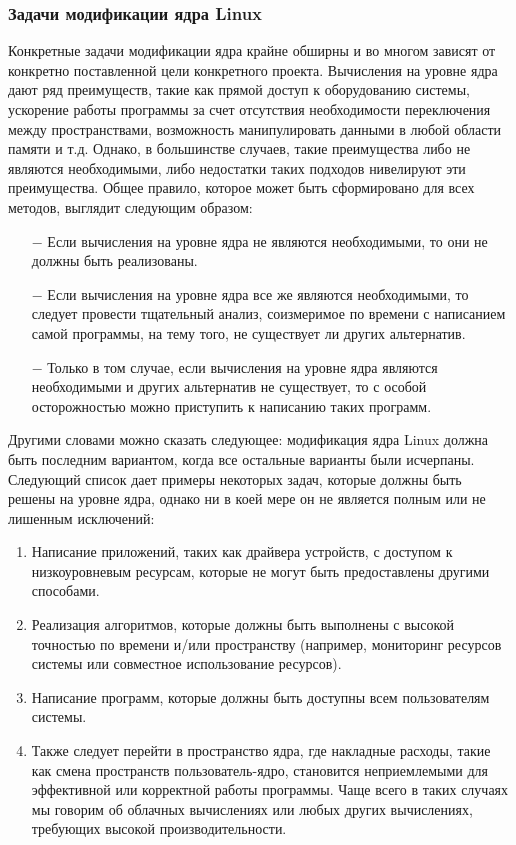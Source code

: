 \subsubsection{Задачи модификации ядра Linux}\label{subsec:---linux}
Конкретные задачи модификации ядра крайне обширны и во многом зависят от конкретно поставленной цели конкретного проекта.
Вычисления на уровне ядра дают ряд преимуществ, такие как прямой доступ к оборудованию системы,
ускорение работы программы за счет отсутствия необходимости переключения между пространствами,
возможность манипулировать данными в любой области памяти и т.д.
Однако, в большинстве случаев, такие преимущества либо не являются необходимыми, либо недостатки таких подходов нивелируют эти преимущества.
Общее правило, которое может быть сформировано для всех методов, выглядит следующим образом:
\begin{itemize}
    \item[$-$] Если вычисления на уровне ядра не являются необходимыми, то они не должны быть реализованы.
    \item[$-$] Если вычисления на уровне ядра все же являются необходимыми, то следует провести тщательный анализ, соизмеримое по времени с написанием самой программы, на тему того, не существует ли других альтернатив.
    \item[$-$] Только в том случае, если вычисления на уровне ядра являются необходимыми и других альтернатив не существует, то с особой осторожностью можно приступить к написанию таких программ.
\end{itemize}

Другими словами можно сказать следующее: модификация ядра Linux должна быть последним вариантом,
когда все остальные варианты были исчерпаны.
\\
Следующий список дает примеры некоторых задач, которые должны быть решены на уровне ядра, однако ни в коей мере он не является полным или не лишенным исключений:
\begin{enumerate}
    \item Написание приложений, таких как драйвера устройств, с доступом к низкоуровневым ресурсам, которые не могут быть предоставлены другими способами.
    \item Реализация алгоритмов, которые должны быть выполнены с высокой точностью по времени и/или пространству (например, мониторинг ресурсов системы или совместное использование ресурсов)\cite{overhead-timer}.
    \item Написание программ, которые должны быть доступны всем пользователям системы.
    \item Также следует перейти в пространство ядра, где накладные расходы, такие как смена пространств пользователь-ядро, становится неприемлемыми для эффективной или корректной работы программы\cite{overhead-timer}.
    Чаще всего в таких случаях мы говорим об облачных вычислениях\cite{overhead-cloud} или любых других вычислениях, требующих высокой производительности.
\end{enumerate}
